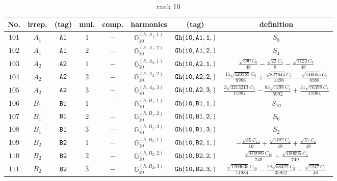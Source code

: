 \documentclass[fleqn,8pt]{jsarticle}
\begin{document}
\begin{table}[ht!]
\begin{center}
\caption{rank 10}
\renewcommand{\arraystretch}{1.3}
\begin{tabular}{cccccccc} \hline \hline
No. & irrep. & (tag) & mul. & comp. & harmonics & (tag) & definition \\ \hline
$ 101 $ & $ A_{1} $ & $ {\tt A1} $ & $ 1 $ & $ - $ & $ \mathbb{G}_{10}^{(h,A_{1},1)} $ & $ {\tt Gh(10,A1,1,)} $ & $ S_{8} $ \\
$ 102 $ & $ A_{1} $ & $ {\tt A1} $ & $ 2 $ & $ - $ & $ \mathbb{G}_{10}^{(h,A_{1},2)} $ & $ {\tt Gh(10,A1,2,)} $ & $ S_{4} $ \\
$ 103 $ & $ A_{2} $ & $ {\tt A2} $ & $ 1 $ & $ - $ & $ \mathbb{G}_{10}^{(h,A_{2},1)} $ & $ {\tt Gh(10,A2,1,)} $ & $ \frac{\sqrt{390} C_{0}}{48} - \frac{\sqrt{22} C_{4}}{8} - \frac{\sqrt{1122} C_{8}}{48} $ \\
$ 104 $ & $ A_{2} $ & $ {\tt A2} $ & $ 2 $ & $ - $ & $ \mathbb{G}_{10}^{(h,A_{2},2)} $ & $ {\tt Gh(10,A2,2,)} $ & $ \frac{11 \sqrt{420189} C_{0}}{8988} + \frac{\sqrt{827645} C_{4}}{1498} - \frac{\sqrt{146055} C_{8}}{8988} $ \\
$ 105 $ & $ A_{2} $ & $ {\tt A2} $ & $ 3 $ & $ - $ & $ \mathbb{G}_{10}^{(h,A_{2},3)} $ & $ {\tt Gh(10,A2,3,)} $ & $ \frac{3 \sqrt{3213210} C_{0}}{11984} - \frac{83 \sqrt{1498} C_{4}}{5992} + \frac{31 \sqrt{76398} C_{8}}{11984} $ \\
$ 106 $ & $ B_{1} $ & $ {\tt B1} $ & $ 1 $ & $ - $ & $ \mathbb{G}_{10}^{(h,B_{1},1)} $ & $ {\tt Gh(10,B1,1,)} $ & $ S_{10} $ \\
$ 107 $ & $ B_{1} $ & $ {\tt B1} $ & $ 2 $ & $ - $ & $ \mathbb{G}_{10}^{(h,B_{1},2)} $ & $ {\tt Gh(10,B1,2,)} $ & $ S_{6} $ \\
$ 108 $ & $ B_{1} $ & $ {\tt B1} $ & $ 3 $ & $ - $ & $ \mathbb{G}_{10}^{(h,B_{1},3)} $ & $ {\tt Gh(10,B1,3,)} $ & $ S_{2} $ \\
$ 109 $ & $ B_{2} $ & $ {\tt B2} $ & $ 1 $ & $ - $ & $ \mathbb{G}_{10}^{(h,B_{2},1)} $ & $ {\tt Gh(10,B2,1,)} $ & $ - \frac{\sqrt{85} C_{10}}{16} + \frac{\sqrt{1482} C_{2}}{48} + \frac{\sqrt{57} C_{6}}{48} $ \\
$ 110 $ & $ B_{2} $ & $ {\tt B2} $ & $ 2 $ & $ - $ & $ \mathbb{G}_{10}^{(h,B_{2},2)} $ & $ {\tt Gh(10,B2,2,)} $ & $ \frac{\sqrt{370006} C_{10}}{749} + \frac{\sqrt{190995} C_{2}}{749} $ \\
$ 111 $ & $ B_{2} $ & $ {\tt B2} $ & $ 3 $ & $ - $ & $ \mathbb{G}_{10}^{(h,B_{2},3)} $ & $ {\tt Gh(10,B2,3,)} $ & $ \frac{\sqrt{1209635} C_{10}}{11984} - \frac{19 \sqrt{58422} C_{2}}{35952} + \frac{\sqrt{2247} C_{6}}{48} $ \\

\end{tabular}
\end{center}
\end{table}
\end{document}
